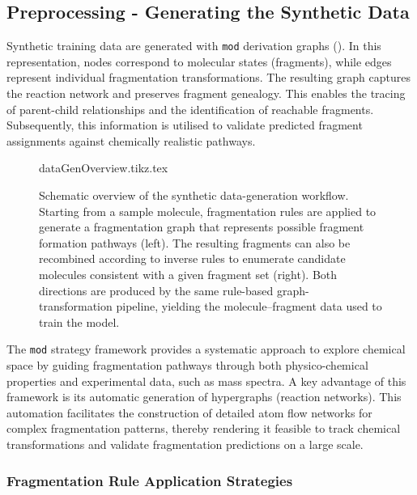 \subsection{Preprocessing - Generating the Synthetic Data}

Synthetic training data are generated with \texttt{mod} derivation graphs ().
In this representation, nodes correspond to molecular states (fragments), while edges represent individual fragmentation transformations.
The resulting graph captures the reaction network and preserves fragment genealogy.
This enables the tracing of parent-child relationships and the identification of reachable fragments.
Subsequently, this information is utilised to validate predicted fragment assignments against chemically realistic pathways.

\begin{figure}
    \centering
    {dataGenOverview.tikz.tex}
    \caption[Schematic of the synthetic data-generation workflow]{
        Schematic overview of the synthetic data-generation workflow.
        Starting from a sample molecule, fragmentation rules are applied to generate a fragmentation graph
        that represents possible fragment formation pathways (left).
        The resulting fragments can also be recombined according to inverse rules to enumerate
        candidate molecules consistent with a given fragment set (right).
        Both directions are produced by the same rule-based graph-transformation pipeline,
        yielding the molecule--fragment data used to train the model.
    }
    \label{fig:data-gen-overview}
\end{figure}

The \texttt{mod} strategy framework provides a systematic approach to explore chemical space by guiding fragmentation pathways through both physico-chemical properties and experimental data, such as mass spectra.
A key advantage of this framework is its automatic generation of hypergraphs (reaction networks).
This automation facilitates the construction of detailed atom flow networks for complex fragmentation patterns, thereby rendering it feasible to track chemical transformations and validate fragmentation predictions on a large scale.
\cite[p.~7]{Andersen2017}

\subsubsection{Fragmentation Rule Application Strategies}

